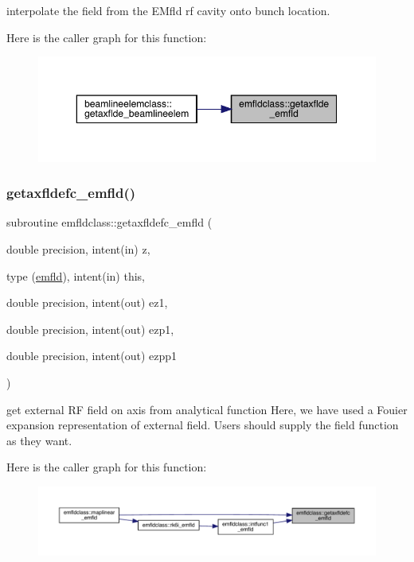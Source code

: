 interpolate the field from the E\+Mfld rf cavity onto bunch location. 

Here is the caller graph for this function\+:\nopagebreak
\begin{figure}[H]
\begin{center}
\leavevmode
\includegraphics[width=350pt]{namespaceemfldclass_a2b0b3e7b6537f3a6ea857f99288186ef_icgraph}
\end{center}
\end{figure}
\mbox{\label{namespaceemfldclass_ae77f42a7f667c3dd902df1d26480e602}} 
\subsubsection{\texorpdfstring{getaxfldefc\_emfld()}{getaxfldefc\_emfld()}}
{\footnotesize\ttfamily subroutine emfldclass\+::getaxfldefc\+\_\+emfld (\begin{DoxyParamCaption}\item[{double precision, intent(in)}]{z,  }\item[{type (\mbox{\hyperlink{namespaceemfldclass_structemfldclass_1_1emfld}{emfld}}), intent(in)}]{this,  }\item[{double precision, intent(out)}]{ez1,  }\item[{double precision, intent(out)}]{ezp1,  }\item[{double precision, intent(out)}]{ezpp1 }\end{DoxyParamCaption})}



get external RF field on axis from analytical function Here, we have used a Fouier expansion representation of external field. Users should supply the field function as they want. 

Here is the caller graph for this function\+:\nopagebreak
\begin{figure}[H]
\begin{center}
\leavevmode
\includegraphics[width=350pt]{namespaceemfldclass_ae77f42a7f667c3dd902df1d26480e602_icgraph}
\end{center}
\end{figure}
\mbox{\label{namespaceemfldclass_a7eb67a0a1ce6ea3f37b4c55e40048f4a}} 
